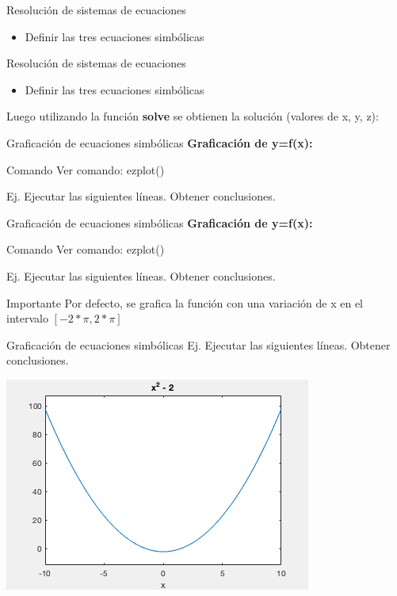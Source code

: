 \documentclass{bredelebeamer}
\begin{document}
\begin{frame}{Resolución de sistemas de ecuaciones}
\begin{itemize}
\item Definir las tres ecuaciones simbólicas
\end{itemize}

\end{frame}

\begin{frame}{Resolución de sistemas de ecuaciones}
\begin{itemize}
\item Definir las tres ecuaciones simbólicas
\end{itemize}

Luego utilizando la función \textbf{solve} se obtienen la solución (valores de x, y, z):

\end{frame}

\begin{frame}{Graficación de ecuaciones simbólicas}
\textbf{Graficación de y=f(x):}
\begin{exampleblock}{Comando}
Ver comando: ezplot()
\end{exampleblock}
Ej. Ejecutar las siguientes líneas. Obtener conclusiones.

\end{frame}

\begin{frame}{Graficación de ecuaciones simbólicas}
\textbf{Graficación de y=f(x):}
\begin{exampleblock}{Comando}
Ver comando: ezplot()
\end{exampleblock}
Ej. Ejecutar las siguientes líneas. Obtener conclusiones.

\begin{alertblock}{Importante}
Por defecto, se grafica la función con una variación de x en el intervalo $[-2*\pi ,2*\pi ]$
\end{alertblock}
\end{frame}

\begin{frame}{Graficación de ecuaciones simbólicas}
Ej. Ejecutar las siguientes líneas. Obtener conclusiones.

\begin{center}
\includegraphics[scale=0.4]{images/fig3.png}
\end{center}
\end{frame}
\end{document}

